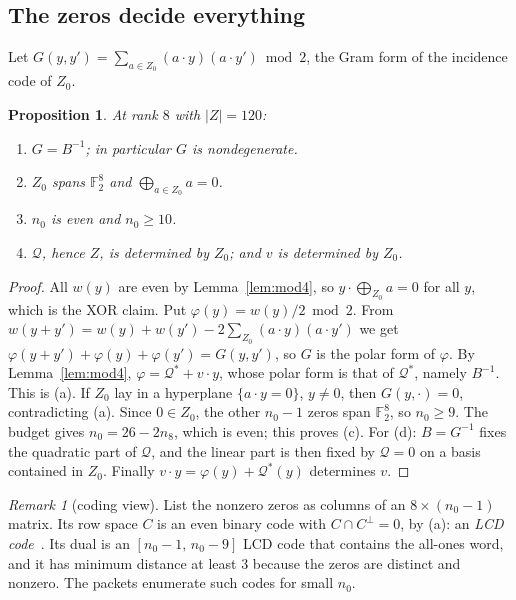 \documentclass[11pt]{article}
\newtheorem{proposition}[theorem]{Proposition}
\theoremstyle{definition}
\theoremstyle{remark}
\newtheorem{remark}[theorem]{Remark}
\newcommand{\F}{\mathbb{F}}
\DeclareRobustCommand{\_}{\textunderscore\allowbreak}
\begin{document}
\subsection{The zeros decide everything}

Let $G(y,y')=\sum_{a\in Z_0}(a\cdot y)(a\cdot y')\bmod 2$, the Gram form of the incidence code of $Z_0$.

\begin{proposition}\label{prop:zeros}
At rank $8$ with $|Z|=120$:
\begin{enumerate}[label=(\alph*),nosep]
\item $G=B^{-1}$; in particular $G$ is nondegenerate.
\item $Z_0$ spans $\F_2^8$ and $\bigoplus_{a\in Z_0}a=0$.
\item $n_0$ is even and $n_0\ge10$.
\item $\mathcal Q$, hence $Z$, is determined by $Z_0$; and $v$ is determined by $Z_0$.
\end{enumerate}
\end{proposition}

\begin{proof}
All $w(y)$ are even by Lemma~\ref{lem:mod4}, so $y\cdot\bigoplus_{Z_0}a=0$ for all $y$, which is the XOR claim. Put $\varphi(y)=w(y)/2\bmod 2$. From $w(y+y')=w(y)+w(y')-2\sum_{Z_0}(a\cdot y)(a\cdot y')$ we get $\varphi(y+y')+\varphi(y)+\varphi(y')=G(y,y')$, so $G$ is the polar form of $\varphi$. By Lemma~\ref{lem:mod4}, $\varphi=\mathcal Q^*+v\cdot y$, whose polar form is that of $\mathcal Q^*$, namely $B^{-1}$. This is (a). If $Z_0$ lay in a hyperplane $\{a\cdot y=0\}$, $y\ne0$, then $G(y,\cdot)=0$, contradicting (a). Since $0\in Z_0$, the other $n_0-1$ zeros span $\F_2^8$, so $n_0\ge9$. The budget gives $n_0=26-2n_8$, which is even; this proves (c). For (d): $B=G^{-1}$ fixes the quadratic part of $\mathcal Q$, and the linear part is then fixed by $\mathcal Q=0$ on a basis contained in $Z_0$. Finally $v\cdot y=\varphi(y)+\mathcal Q^*(y)$ determines $v$.
\end{proof}

\begin{remark}[coding view]
List the nonzero zeros as columns of an $8\times(n_0-1)$ matrix. Its row space $C$ is an even binary code with $C\cap C^\perp=0$, by (a): an \emph{LCD code}~\cite{Massey}. Its dual is an $[n_0-1,\,n_0-9]$ LCD code that contains the all-ones word, and it has minimum distance at least $3$ because the zeros are distinct and nonzero. The packets enumerate such codes for small $n_0$.
\end{remark}
\end{document}

